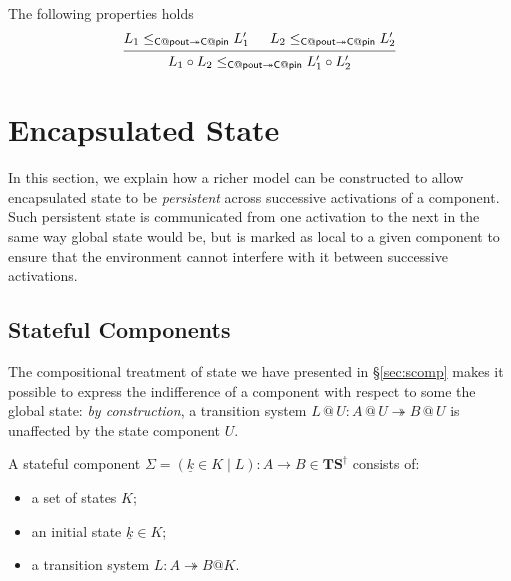 \documentclass[acmsmall,screen,review,anonymous]{acmart}
\newcommand{\kw}[1]{\ensuremath{ \mathsf{#1} }}
\newcommand{\intl}[1]{\underline{#1}}
\newcommand{\ClightP}{\ensuremath{ \mathsf{ClightP} }}
\begin{document}
\begin{lemma}[Composition of $\ClightP$]
  The following properties holds
  \[
    \begin{prooftree}
      \hypo{L_1 \le_{\mathsf{C}@\kw{pout} \twoheadrightarrow \mathsf{C}@\kw{pin}} L'_1}
      \hypo{L_2 \le_{\mathsf{C}@\kw{pout} \twoheadrightarrow \mathsf{C}@\kw{pin}} L'_2}
      \infer2{L_1 \circ L_2 \le_{\mathsf{C}@\kw{pout} \twoheadrightarrow \mathsf{C}@\kw{pin}} L'_1 \circ L'_2}
    \end{prooftree}
  \]
\end{lemma}



\section{Encapsulated State} \label{sec:encap} %


In this section,
we explain how a richer model can be constructed
to allow encapsulated state
to be \emph{persistent} across
successive activations of a component.
Such persistent state
is communicated from one activation to the next
in the same way global state would be,
but is marked as local to a given component
to ensure that the environment cannot interfere
with it between successive activations.


\subsection{Stateful Components} %

The compositional treatment of state
we have presented in \S\ref{sec:scomp}
makes it possible to express
the indifference of a component
with respect to some the global state:
\emph{by construction},
a transition system
$L \mathbin@ U : A \mathbin@ U \twoheadrightarrow B \mathbin@ U$
is unaffected by the state component $U$.

\begin{definition} \label{def:slts}
A stateful component
$\Sigma = (\intl{k} \in K \mid L) : A \rightarrow B \in \mathbf{TS}^\dagger$
consists of:
\begin{itemize}
  \item a set of states $K$;
  \item an initial state $\intl{k} \in K$;
  \item a transition system $L : A \twoheadrightarrow B@K$.
\end{itemize}
\end{definition}
\end{document}
